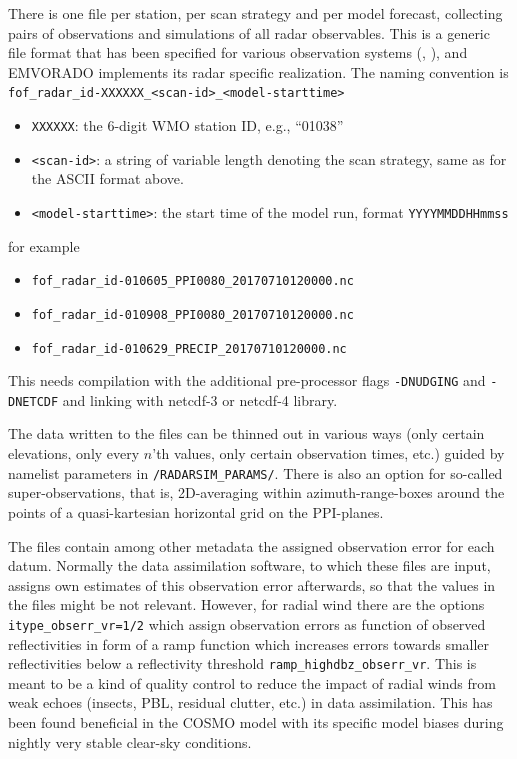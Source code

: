 \documentclass[10pt,a4paper,twoside,headinclude,footinclude,parskip=half]{scrartcl}
\newcommand{\citeNPK}[1]{\citeauthor{#1}, \citeyear{#1}}
\newcommand{\srcform}[1]{\mbox{\texttt{#1}}\xspace}%
\newcommand{\paramform}[1]{\mbox{\texttt{#1}}\xspace}%
\begin{document}
There is one file per station, per scan strategy and per model forecast, collecting pairs
  of observations and simulations of all radar observables. This is a generic file format that has been specified for
  various observation systems (\citeNPK{rhodin2012}), and EMVORADO implements its radar specific realization. The naming convention is\\[0.5em]
  \verb|fof_radar_id-XXXXXX_<scan-id>_<model-starttime>|
  \begin{itemize}
  \item \verb|XXXXXX|: the 6-digit WMO station ID, e.g., ``01038''
  \item \verb|<scan-id>|: a string of variable length denoting the scan strategy, same as for the ASCII format above.
  \item \verb|<model-starttime>|: the start time of the model run, format \verb|YYYYMMDDHHmmss|
  \end{itemize}
  for example
  \begin{itemize}
  \item \verb|fof_radar_id-010605_PPI0080_20170710120000.nc|
  \item \verb|fof_radar_id-010908_PPI0080_20170710120000.nc|
  \item \verb|fof_radar_id-010629_PRECIP_20170710120000.nc|
  \end{itemize}
  This needs compilation with the additional pre-processor flags \srcform{-DNUDGING} and \srcform{-DNETCDF} and linking with netcdf-3 or netcdf-4 library.

  The data written to the files can be thinned out in various ways (only certain elevations, only every $n$'th values, only certain observation times, etc.) guided by namelist
  parameters in \srcform{/RADARSIM_PARAMS/}. There is also an option for so-called super-observations, that is, 2D-averaging
  within azimuth-range-boxes around the points of a quasi-kartesian horizontal grid on the PPI-planes.

  The files contain among other metadata the assigned observation error for each datum. Normally the data assimilation software, to
  which these files are input, assigns own estimates of this observation error afterwards, so that the values in the files might be not relevant.
  However, for radial wind there are the options \paramform{itype_obserr_vr=1/2} which assign observation errors 
  as function of observed reflectivities in form of a ramp function which increases errors towards smaller reflectivities below a
  reflectivity threshold \paramform{ramp_highdbz_obserr_vr}. This is meant to be a kind of quality control to
  reduce the impact of radial winds from weak echoes (insects, PBL, residual clutter, etc.) in data assimilation. This has
  been found beneficial in the COSMO model with its specific model biases during nightly very stable clear-sky conditions.
\end{document}
